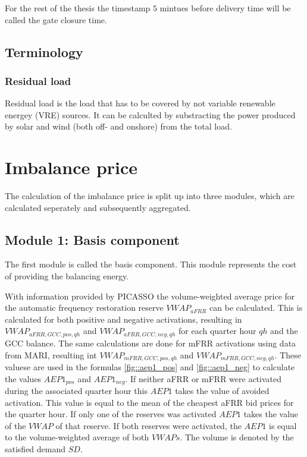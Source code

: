 \documentclass[class=scrbook, crop=false]{standalone}
\begin{document}
For the rest of the thesis the timestamp $5$ mintues before delivery time will be called the gate closure time.

\subsection{Terminology}

\subsubsection{Residual load}

Residual load is the load  that has to be covered by not variable renewable energey (VRE) sources.
It can be calculted by substracting the power produced by solar and wind (both off- and onshore) from the total load.

\section{Imbalance price}
\label{Section::Imbalance_Price}
The calculation of the imbalance price is split up into three modules, which are calculated seperately and subsequently aggregated.

\subsection{Module 1: Basis component}
The first module is called the basis component. 
This module represents the cost of providing the balancing energy.

With information provided by PICASSO the volume-weighted average price for the automatic frequency restoration reserve $VWAP_{aFRR}$ can be calculated. This is calculated for both positive and negative activations, resulting in $VWAP_{aFRR, GCC, pos, qh}$ and $VWAP_{aFRR,  GCC, neg, qh}$ for each quarter hour $qh$ and the GCC balance.
The same calculations are done for mFRR activations using data from MARI, resulting int $VWAP_{mFRR, GCC, pos, qh}$ and $VWAP_{mFRR, GCC, neg, qh}$. 
These valuese are used in the formulas \ref{fig::aep1_pos} and \ref{fig::aep1_neg} to calculate the values $AEP1_{pos}$ and $AEP1_{neg}$. 
If neither aFRR or mFRR were activated during the associated quarter hour this $AEP1$ takes the value of avoided activation. This value is equal to the mean of the cheapest aFRR bid prices for the quarter hour.
If only one of the reserves was activated $AEP1$ takes the value of the $VWAP$ of that reserve. 
If both reserves were activated, the $AEP1$ is equal to the volume-weighted average of both $VWAPs$. The volume is denoted by the satisfied demand $SD$.
\end{document}
